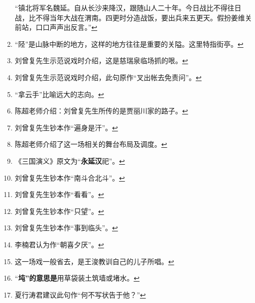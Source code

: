 \begin{enumerate}
  ``镇北将军名魏延。自从长沙来降汉，跟随山人二十年。今日战比不得往日战，比不得当年大战在渭南。四更时分造战饭，要出兵来五更天。假扮姜维关前站，口口声声出反言。''\protect\hyperlink{fnref280}{↩}
\item
  \leavevmode\hypertarget{fn281}{}%
  ``陉''是山脉中断的地方，这样的地方往往是重要的关隘。这里特指街亭。\protect\hyperlink{fnref281}{↩}
\item
  \leavevmode\hypertarget{fn282}{}%
  刘曾复先生示范说戏时介绍，这是慈瑞泉临场抓的哏。\protect\hyperlink{fnref282}{↩}
\item
  \leavevmode\hypertarget{fn283}{}%
  刘曾复先生示范说戏时介绍，此句原作``叉出帐去免责问''。\protect\hyperlink{fnref283}{↩}
\item
  \leavevmode\hypertarget{fn284}{}%
  ``拿云手''比喻远大的志向。\protect\hyperlink{fnref284}{↩}
\item
  \leavevmode\hypertarget{fn285}{}%
  陈超老师介绍：刘曾复先生所传的是贾丽川家的路子。\protect\hyperlink{fnref285}{↩}
\item
  \leavevmode\hypertarget{fn286}{}%
  刘曾复先生钞本作``遍身是汗''。\protect\hyperlink{fnref286}{↩}
\item
  \leavevmode\hypertarget{fn287}{}%
  陈超老师介绍了这一场相关的舞台布局及调度。\protect\hyperlink{fnref287}{↩}
\item
  \leavevmode\hypertarget{fn288}{}%
  《三国演义》原文为``\textbf{永延汉}祀''。\protect\hyperlink{fnref288}{↩}
\item
  \leavevmode\hypertarget{fn289}{}%
  刘曾复先生钞本作``南斗合北斗''。\protect\hyperlink{fnref289}{↩}
\item
  \leavevmode\hypertarget{fn290}{}%
  刘曾复先生钞本作``看看''。\protect\hyperlink{fnref290}{↩}
\item
  \leavevmode\hypertarget{fn291}{}%
  刘曾复先生钞本作``只望''。\protect\hyperlink{fnref291}{↩}
\item
  \leavevmode\hypertarget{fn292}{}%
  刘曾复先生钞本作``事到临头''。\protect\hyperlink{fnref292}{↩}
\item
  \leavevmode\hypertarget{fn293}{}%
  李楠君认为作``朝喜夕厌''。\protect\hyperlink{fnref293}{↩}
\item
  \leavevmode\hypertarget{fn294}{}%
  这一场戏一般省去，是王浚教训自己的儿子所唱。\protect\hyperlink{fnref294}{↩}
\item
  \leavevmode\hypertarget{fn295}{}%
  ``\textbf{坉''的意思是}用草袋装土筑墙或堵水。\protect\hyperlink{fnref295}{↩}
\item
  \leavevmode\hypertarget{fn296}{}%
  夏行涛君建议此句作``何不写状告于他？''\protect\hyperlink{fnref296}{↩}

\end{enumerate}

